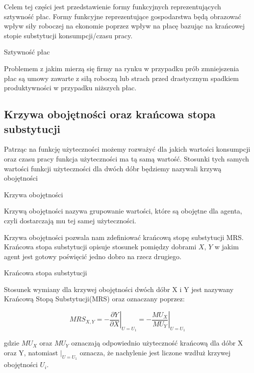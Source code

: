 Celem tej części jest przedstawienie formy funkcyjnych reprezentujących sztywność płac. Formy funkcyjne reprezentujące gospodarstwa będą obrazować wpływ siły roboczej na ekonomie poprzez wpływ na płacę bazując na krańcowej stopie substytucji konsumpcji/czasu pracy.

\begin{definition}{Sztywność płac}
    
    Problemem z jakim mierzą się firmy na rynku w przypadku prób zmniejszenia płac są umowy zawarte z siłą roboczą lub strach przed drastycznym spadkiem produktywności w przypadku niższych płac.
    
\end{definition}


\subsection{Krzywa obojętności oraz krańcowa stopa substytucji}

Patrząc na funkcję użyteczności możemy rozważyć dla jakich wartości konsumpcji oraz czasu pracy funkcja użyteczności ma tą samą wartość. Stosunki tych samych wartości funkcji użyteczności dla dwóch dóbr będziemy nazywali krzywą obojętności

\begin{definition}{Krzywa obojętności}

    Krzywą obojętności nazywa grupowanie wartości, które są obojętne dla agenta, czyli dostarczają mu tej samej użyteczności.

\end{definition}

Krzywa obojętności pozwala nam zdefiniować krańcową stopę substytucji MRS. Krańcowa stopa substytucji opisuje stosunek pomiędzy dobrami $X$, $Y$ w jakim agent jest gotowy poświęcić jedno dobro na rzecz drugiego.

\begin{definition}{Krańcowa stopa substytucji}
    
    Stosunek wymiany dla krzywej obojętności dwóch dóbr X i Y jest nazywany Krańcową Stopą Substytucji(MRS) oraz oznaczany poprzez:
    
    \begin{equation*}
        MRS_{X,Y} = -\left.\frac{\partial Y}{\partial X}\right|_{U = U_1} = -\left.\frac{MU_X}{MU_Y}\right|_{U = U_1}
    \end{equation*}
    
    gdzie $MU_X$ oraz $MU_Y$ oznaczają odpowiednio użyteczność krańcową dla dóbr X oraz Y, natomiast $\left.\right|_{U = U_1}$ oznacza, że nachylenie jest liczone wzdłuż krzywej obojętności $U_i$.
\end{definition}

